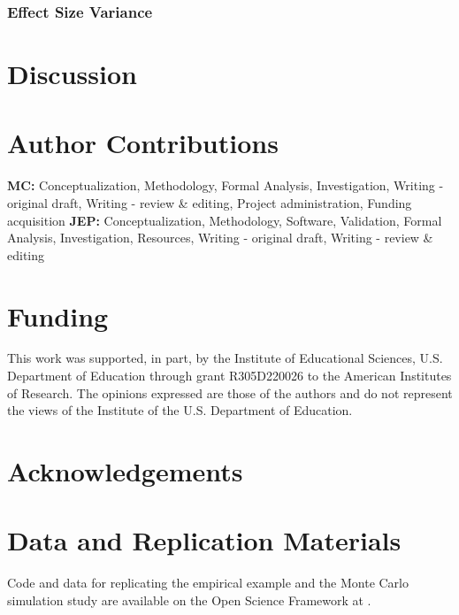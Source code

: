 \documentclass[
  american,
  man, donotrepeattitle,floatsintext]{apa7}
\begin{document}
\subsubsection{Effect Size Variance}\label{effect-size-variance}

\section{Discussion}\label{discussion}

\section*{Author Contributions}\label{author-contributions}

\textbf{MC:} Conceptualization, Methodology, Formal Analysis, Investigation, Writing - original draft, Writing - review \& editing, Project administration, Funding acquisition \textbf{JEP:} Conceptualization, Methodology, Software, Validation, Formal Analysis, Investigation, Resources, Writing - original draft, Writing - review \& editing

\section*{Funding}\label{funding}

This work was supported, in part, by the Institute of Educational Sciences, U.S. Department of Education through grant R305D220026 to the American Institutes of Research.
The opinions expressed are those of the authors and do not represent the views of the Institute of the U.S. Department of Education.

\section*{Acknowledgements}\label{acknowledgements}

\section*{Data and Replication Materials}\label{data-and-replication-materials}

Code and data for replicating the empirical example and the Monte Carlo simulation study are available on the Open Science Framework at .
\end{document}
